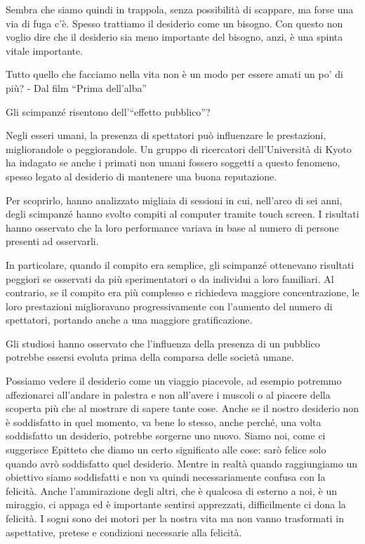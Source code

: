 \documentclass[12pt]{book} %
\begin{document}
Sembra che siamo quindi in trappola, senza possibilità di scappare, ma forse una via di fuga c'è.
Spesso trattiamo il desiderio come un bisogno. Con questo non voglio dire che il desiderio sia meno importante del
bisogno, anzi, è una spinta vitale importante.

Tutto quello che facciamo nella vita non è un modo per essere amati un po' di più? - Dal film “Prima dell'alba”

\begin{mdframed}[linewidth=1pt]
Gli scimpanzé risentono dell’“effetto pubblico”?

Negli esseri umani, la presenza di spettatori può influenzare le prestazioni, migliorandole o peggiorandole. Un gruppo di ricercatori dell’Università di Kyoto ha indagato se anche i primati non umani fossero soggetti a questo fenomeno, spesso legato al desiderio di mantenere una buona reputazione.

Per scoprirlo, hanno analizzato migliaia di sessioni in cui, nell’arco di sei anni, degli scimpanzé hanno svolto compiti al computer tramite touch screen. I risultati hanno osservato che la loro performance variava in base al numero di persone presenti ad osservarli.

In particolare, quando il compito era semplice, gli scimpanzé ottenevano risultati peggiori se osservati da più sperimentatori o da individui a loro familiari. Al contrario, se il compito era più complesso e richiedeva maggiore concentrazione, le loro prestazioni miglioravano progressivamente con l’aumento del numero di spettatori, portando anche a una maggiore gratificazione.

Gli studiosi hanno osservato che l'influenza della presenza di un pubblico potrebbe essersi evoluta prima della comparsa delle società umane.
\end{mdframed}

Possiamo vedere il desiderio come un viaggio piacevole, ad esempio potremmo affezionarci
 all'andare in palestra e non all'avere i muscoli o al piacere della scoperta più che al mostrare di
 sapere tante cose. Anche se il nostro desiderio non è soddisfatto in quel momento, va bene lo stesso, anche perché, una volta soddisfatto un desiderio, potrebbe sorgerne uno nuovo. Siamo noi, come ci suggerisce Epitteto
che diamo un certo significato alle cose: sarò felice solo quando avrò soddisfatto quel desiderio. Mentre in realtà
quando raggiungiamo un obiettivo siamo soddisfatti e non va quindi necessariamente confusa con la felicità. Anche
l'ammirazione degli altri, che è qualcosa di esterno a noi, è un miraggio, ci appaga ed è
importante sentirsi apprezzati, difficilmente ci dona la felicità. I sogni sono dei motori per la nostra vita ma non vanno
trasformati in aspettative, pretese e condizioni necessarie alla felicità.
\end{document}
